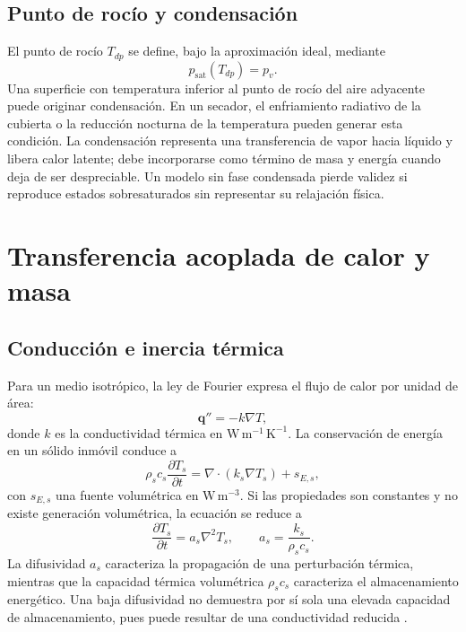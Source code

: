 \subsection{Punto de rocío y condensación}

El punto de rocío $T_{dp}$ se define, bajo la aproximación ideal, mediante
\begin{equation}
p_{\mathrm{sat}}(T_{dp})=p_v.
\label{eq:punto_rocio}
\end{equation}
Una superficie con temperatura inferior al punto de rocío del aire adyacente puede originar condensación. En un secador, el enfriamiento radiativo de la cubierta o la reducción nocturna de la temperatura pueden generar esta condición. La condensación representa una transferencia de vapor hacia líquido y libera calor latente; debe incorporarse como término de masa y energía cuando deja de ser despreciable. Un modelo sin fase condensada pierde validez si reproduce estados sobresaturados sin representar su relajación física.

\section{Transferencia acoplada de calor y masa}
\label{sec:transferencia_calor_masa}

\subsection{Conducción e inercia térmica}

Para un medio isotrópico, la ley de Fourier expresa el flujo de calor por unidad de área:
\begin{equation}
\mathbf q''=-k\nabla T,
\label{eq:fourier}
\end{equation}
donde $k$ es la conductividad térmica en $\mathrm{W\,m^{-1}\,K^{-1}}$. La conservación de energía en un sólido inmóvil conduce a
\begin{equation}
\rho_s c_s\frac{\partial T_s}{\partial t}
=\nabla\cdot(k_s\nabla T_s)+s_{E,s},
\label{eq:heatdiffusion}
\end{equation}
con $s_{E,s}$ una fuente volumétrica en $\mathrm{W\,m^{-3}}$. Si las propiedades son constantes y no existe generación volumétrica, la ecuación se reduce a
\begin{equation}
\frac{\partial T_s}{\partial t}=a_s\nabla^2T_s,
\qquad
a_s=\frac{k_s}{\rho_sc_s}.
\label{eqn:transferenciacalor}
\end{equation}
La difusividad $a_s$ caracteriza la propagación de una perturbación térmica, mientras que la capacidad térmica volumétrica $\rho_sc_s$ caracteriza el almacenamiento energético. Una baja difusividad no demuestra por sí sola una elevada capacidad de almacenamiento, pues puede resultar de una conductividad reducida \cite{bergman2017}.

